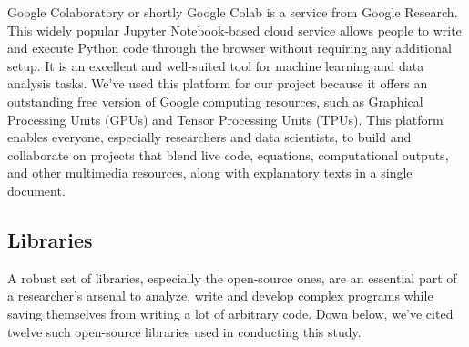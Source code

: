 \documentclass{swfuthesise}
\begin{document}
Google Colaboratory or shortly Google Colab is a service from Google Research. This widely popular Jupyter Notebook-based cloud service allows people to write and execute Python code through the browser without requiring any additional setup. It is an excellent and well-suited tool for machine learning and data analysis tasks. We've used this platform for our project because it offers an outstanding free version of Google computing resources, such as Graphical Processing Units (GPUs) and Tensor Processing Units (TPUs). This platform enables everyone, especially researchers and data scientists, to build and collaborate on projects that blend live code, equations, computational outputs, and other multimedia resources, along with explanatory texts in a single document.

\subsection{Libraries}

A robust set of libraries, especially the open-source ones, are an essential part of a researcher's arsenal to analyze, write and develop complex programs while saving themselves from writing a lot of arbitrary code. Down below, we've cited twelve such open-source libraries used in conducting this study.
\end{document}
